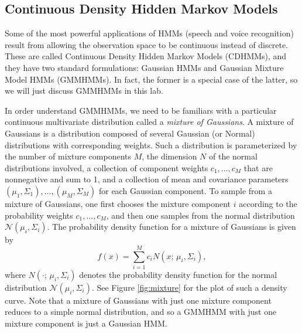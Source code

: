 
\subsection{Continuous Density Hidden Markov Models}
Some of the most powerful applications of HMMs (speech and voice recognition) result from allowing the observation space to be continuous instead of discrete.
These are called Continuous Density Hidden Markov Models (CDHMMs), and they have two standard formulations: Gaussian HMMs and Gaussian Mixture Model HMMs (GMMHMMs).
In fact, the former is a special case of the latter, so we will just discuss GMMHMMs in this lab.

In order understand GMMHMMs, we need to be familiars with a particular continuous multivariate distribution called a \emph{mixture of Gaussians}.
A mixture of Gaussians is a distribution composed of several Gaussian (or Normal) distributions with corresponding weights.
Such a distribution is parameterized by the number of mixture components $M$, the dimension $N$ of the normal distributions involved, a collection of component weights
$c_1, \ldots, c_M$ that are nonnegative and sum to 1, and a collection of mean and covariance parameters $(\mu_1,\Sigma_1), \ldots, (\mu_M,\Sigma_M)$ for each Gaussian
component. To sample from a mixture of Gaussians, one first chooses the mixture component $i$ according to the probability weights $c_1,\ldots,c_M$, and then one
samples from the normal distribution $\mathcal{N}(\mu_i, \Sigma_i)$. The probability density function for a mixture of Gaussians is given by
\[
f(x) = \sum_{i=1}^M c_iN(x;\,\mu_i,\Sigma_i),
\]
where $N(\cdot;\,\mu_i,\Sigma_i)$ denotes the probability density function for the normal distribution $\mathcal{N}(\mu_i, \Sigma_i)$.
See Figure \ref{fig:mixture} for the plot of such a density curve.
Note that a mixture of Gaussians with just one mixture component reduces to a simple normal distribution, and so a GMMHMM with just one mixture component
is just a Gaussian HMM.

